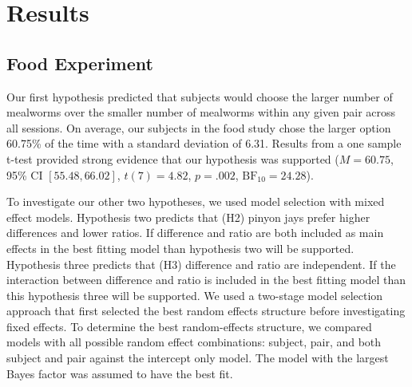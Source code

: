 \documentclass[
  ,doc,floatsintext]{apa6}
\begin{document}
\hypertarget{results}{%
\section{Results}\label{results}}

\hypertarget{food-experiment-1}{%
\subsection{Food Experiment}\label{food-experiment-1}}

Our first hypothesis predicted that subjects would choose the larger number of mealworms over the smaller number of mealworms within any given pair across all sessions. On average, our subjects in the food study chose the larger option 60.75\% of the time with a standard deviation of 6.31. Results from a one sample t-test provided strong evidence that our hypothesis was supported (\(M = 60.75\), 95\% CI \([55.48, 66.02]\), \(t(7) = 4.82\), \(p = .002\), \(\mathrm{BF}_{\textrm{10}} = 24.28\)).

To investigate our other two hypotheses, we used model selection with mixed effect models. Hypothesis two predicts that (H2) pinyon jays prefer higher differences and lower ratios. If difference and ratio are both included as main effects in the best fitting model than hypothesis two will be supported. Hypothesis three predicts that (H3) difference and ratio are independent. If the interaction between difference and ratio is included in the best fitting model than this hypothesis three will be supported. We used a two-stage model selection approach that first selected the best random effects structure before investigating fixed effects. To determine the best random-effects structure, we compared models with all possible random effect combinations: subject, pair, and both subject and pair against the intercept only model. The model with the largest Bayes factor was assumed to have the best fit.
\end{document}
